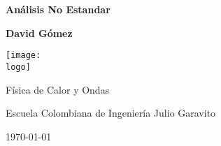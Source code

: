 \documentclass[leqno, 12pt]{article}
\newcommand{\logo}{"logo-eci-normal.png"}
\newcommand{\titlename}{Análisis No Estandar}
\renewcommand{\author}{{David Gómez}}
\theoremstyle{definition}
\theoremstyle{theorem*}
\theoremstyle{proof}
\begin{document}
\begin{titlepage}
    \begin{center}
        \vspace{1cm}

        \textbf{\Huge{\titlename}}

        \vspace{1.5cm}

        \textbf{\large{\author}}

        \vspace{3cm}

        \texttt{[image: \\logo]}
        
        \vfill

        Física de Calor y Ondas

        Escuela Colombiana de Ingeniería Julio Garavito

        \today
    \end{center}
\end{titlepage}

\clearpage
\tableofcontents








\end{document}
